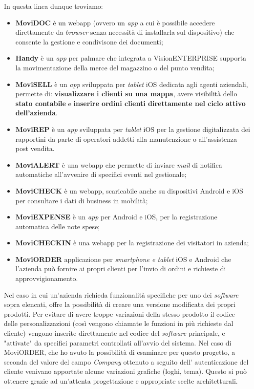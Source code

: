 In questa linea dunque troviamo:
\begin{itemize}
    \item \textbf{MoviDOC} è un \gls{webapp} (ovvero un \textit{app} a cui è possibile accedere direttamente da \textit{browser} senza 
          necessità di installarla sul dispositivo) che consente la gestione e condivisone dei documenti;
    \item \textbf{Handy} è un \textit{app} per palmare che integrata a VisionENTERPRISE supporta la movimentazione della merce del magazzino o del punto vendita;
    \item \textbf{MoviSELL} è un \textit{app} sviluppata per \textit{tablet} iOS dedicata agli agenti aziendali, permette di: \textbf{visualizzare i 
          clienti su una mappa}, avere visibilità dello \textbf{stato contabile} e \textbf{inserire ordini clienti direttamente nel 
          ciclo attivo dell'azienda}.
    \item \textbf{MoviREP} è un \textit{app} sviluppata per \textit{tablet} iOS per la gestione digitalizzata dei rapportini da parte di operatori addetti alla manutenzione o 
          all'assistenza post vendita. 
    \item \textbf{MoviALERT} è una \gls{webapp} che permette di inviare \textit{mail} di notifica automatiche all'avvenire di 
          specifici eventi nel gestionale;
    \item \textbf{MoviCHECK} è un \gls{webapp}, scaricabile anche su dispositivi Android e iOS per 
          consultare i dati di business in mobilità;
    \item \textbf{MoviEXPENSE} è un \textit{app} per Android e iOS, per la registrazione automatica delle note 
          spese;
    \item \textbf{MoviCHECKIN} è una \gls{webapp} per la registrazione dei visitatori in azienda;
    \item \textbf{MoviORDER} applicazione per \textit{smartphone e tablet} iOS e Android che l’azienda può fornire ai propri clienti per l’invio di ordini e 
          richieste di approvvigionamento.
\end{itemize}

Nel caso in cui un'azienda richieda funzionalità specifiche per uno dei \textit{software} sopra elencati, {\company} offre la possibilità di creare una versione 
modificata dei propri prodotti. Per evitare di avere troppe variazioni della stesso prodotto il codice delle personalizzazioni (così vengono chiamate le funzioni in 
più richieste dal cliente) vengono inserite direttamente nel codice del \textit{software} principale, e "attivate" da specifici parametri controllati all'avvio del 
sistema. Nel caso di MoviORDER, che ho avuto la possibilità di esaminare per questo progetto, a seconda del valore del campo \textit{Company} ottenuto a seguito dell'
autenticazione del cliente venivano apportate alcune variazioni grafiche (loghi, tema). Questo si può ottenere grazie ad un'attenta progettazione e appropriate scelte 
architetturali.

 
